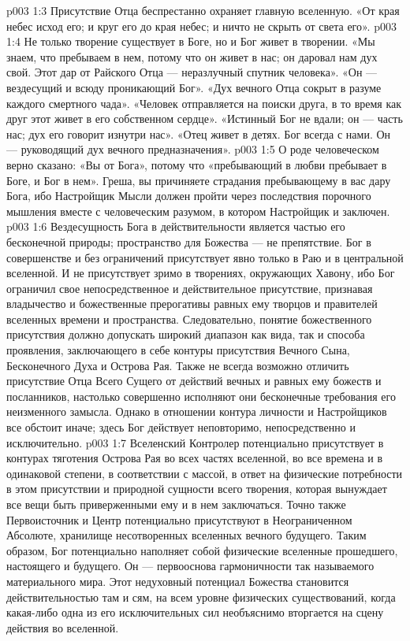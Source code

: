 \vs p003 1:3 Присутствие Отца беспрестанно охраняет главную вселенную. «От края небес исход его; и круг его до края небес; и ничто не скрыть от света его».
\vs p003 1:4 \pc Не только творение существует в Боге, но и Бог живет в творении. «Мы знаем, что пребываем в нем, потому что он живет в нас; он даровал нам дух свой. Этот дар от Райского Отца --- неразлучный спутник человека». «Он --- вездесущий и всюду проникающий Бог». «Дух вечного Отца сокрыт в разуме каждого смертного чада». «Человек отправляется на поиски друга, в то время как друг этот живет в его собственном сердце». «Истинный Бог не вдали; он --- часть нас; дух его говорит изнутри нас». «Отец живет в детях. Бог всегда с нами. Он --- руководящий дух вечного предназначения».
\vs p003 1:5 О роде человеческом верно сказано: «Вы от Бога», потому что «пребывающий в любви пребывает в Боге, и Бог в нем». Греша, вы причиняете страдания пребывающему в вас дару Бога, ибо Настройщик Мысли должен пройти через последствия порочного мышления вместе с человеческим разумом, в котором Настройщик и заключен.
\vs p003 1:6 \pc Вездесущность Бога в действительности является частью его бесконечной природы; пространство для Божества --- не препятствие. Бог в совершенстве и без ограничений присутствует явно только в Раю и в центральной вселенной. И не присутствует зримо в творениях, окружающих Хавону, ибо Бог ограничил свое непосредственное и действительное присутствие, признавая владычество и божественные прерогативы равных ему творцов и правителей вселенных времени и пространства. Следовательно, понятие божественного присутствия должно допускать широкий диапазон как вида, так и способа проявления, заключающего в себе контуры присутствия Вечного Сына, Бесконечного Духа и Острова Рая. Также не всегда возможно отличить присутствие Отца Всего Сущего от действий вечных и равных ему божеств и посланников, настолько совершенно исполняют они бесконечные требования его неизменного замысла. Однако в отношении контура личности и Настройщиков все обстоит иначе; здесь Бог действует неповторимо, непосредственно и исключительно.
\vs p003 1:7 \pc Вселенский Контролер потенциально присутствует в контурах тяготения Острова Рая во всех частях вселенной, во все времена и в одинаковой степени, в соответствии с массой, в ответ на физические потребности в этом присутствии и природной сущности всего творения, которая вынуждает все вещи быть приверженными ему и в нем заключаться. Точно также Первоисточник и Центр потенциально присутствуют в Неограниченном Абсолюте, хранилище несотворенных вселенных вечного будущего. Таким образом, Бог потенциально наполняет собой физические вселенные прошедшего, настоящего и будущего. Он --- первооснова гармоничности так называемого материального мира. Этот недуховный потенциал Божества становится действительностью там и сям, на всем уровне физических существований, когда какая\hyp{}либо одна из его исключительных сил необъяснимо вторгается на сцену действия во вселенной.
